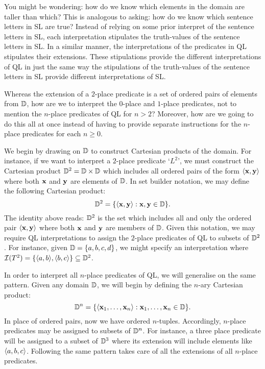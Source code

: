 You might be wondering: how do we know which elements in the domain are taller than which?
This is analogous to asking: how do we know which sentence letters in SL are true?
Instead of relying on some prior interpret of the sentence letters in SL, each interpretation stipulates the truth-values of the sentence letters in SL.
In a similar manner, the interpretations of the predicates in QL stipulates their extensions.
These stipulations provide the different interpretations of QL in just the same way the stipulations of the truth-values of the sentence letters in SL provide different interpretations of SL.

Whereas the extension of a $2$-place predicate is a set of ordered pairs of elements from $\mathbb{D}$, how are we to interpret the $0$-place and $1$-place predicates, not to mention the $n$-place predicates of QL for $n>2$?
Moreover, how are we going to do this all at once instead of having to provide separate instructions for the $n$-place predicates for each $n\geq 0$.

We begin by drawing on $\mathbb{D}$ to construct Cartesian products of the domain.
For instance, if we want to interpret a $2$-place predicate `$L^2$', we must construct the Cartesian product $\mathbb{D}^2=\mathbb{D}\times\mathbb{D}$ which includes all ordered pairs of the form $\langle\mathbf{x},\mathbf{y}\rangle$ where both $\mathbf{x}$ and $\mathbf{y}$ are elements of $\mathbb{D}$.
In set builder notation, we may define the following Cartesian product: 
  $$ \mathbb{D}^2 = \lbrace\langle\mathbf{x},\mathbf{y}\rangle:\mathbf{x},\mathbf{y}\in\mathbb{D}\rbrace. $$
The identity above reads: $\mathbb{D}^2$ is the set which includes all and only the ordered pair $\langle\mathbf{x},\mathbf{y}\rangle$ where both $\mathbf{x}$ and $\mathbf{y}$ are members of $\mathbb{D}$. 
Given this notation, we may require QL interpretations to assign the $2$-place predicates of QL to subsets of $\mathbb{D}^2$. 
For instance, given $\mathbb{D}=\lbrace a,b,c,d\rbrace$, we might specify an interpretation where $\mathcal{I}(T^2)=\lbrace\langle a,b\rangle,\langle b,c\rangle\rbrace\subseteq\mathbb{D}^2$.

In order to interpret all $n$-place predicates of QL, we will generalise on the same pattern.
Given any domain $\mathbb{D}$, we will begin by defining the $n$-ary Cartesian product: 
  $$ \mathbb{D}^n = \lbrace\langle\mathbf{x}_1,\ldots,\mathbf{x}_n\rangle:\mathbf{x}_1,\ldots,\mathbf{x}_n\in\mathbb{D}\rbrace.$$ %
In place of ordered pairs, now we have ordered $n$-tuples.
Accordingly, $n$-place predicates may be assigned to subsets of $\mathbb{D}^n$.
For instance, a three place predicate will be assigned to a subset of $\mathbb{D}^3$ where its extension will include elements like $\langle a,b,c\rangle$.
Following the same pattern takes care of all the extensions of all $n$-place predicates.

